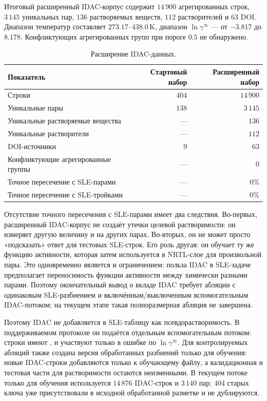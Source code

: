 \documentclass[11pt]{article}
\DeclareRobustCommand{\code}[1]{\texttt{\detokenize{#1}}}
\theoremstyle{definition}
\begin{document}
Итоговый расширенный IDAC-корпус содержит $14\,900$ агрегированных строк, $3\,145$ уникальных пар, $136$ растворяемых веществ, $112$ растворителей и $63$ DOI. Диапазон температур составляет $273.17$--$438.0\,\mathrm K$, диапазон $\ln\gamma^\infty$ --- от $-3.817$ до $8.178$. Конфликтующих агрегированных групп при пороге $0.5$ не обнаружено.

\begin{table}[H]
\centering
\caption{Расширение IDAC-данных.}
\label{tab:idac-corpus}
\begin{tabular}{lrr}
\toprule
Показатель & Стартовый набор & Расширенный набор \\
\midrule
Строки & $404$ & $14\,900$ \\
Уникальные пары & $138$ & $3\,145$ \\
Уникальные растворяемые вещества & --- & $136$ \\
Уникальные растворители & --- & $112$ \\
DOI-источники & $9$ & $63$ \\
Конфликтующие агрегированные группы & --- & $0$ \\
Точное пересечение с SLE-парами & --- & $0\%$ \\
Точное пересечение с SLE-тройками & --- & $0\%$ \\
\bottomrule
\end{tabular}
\end{table}

Отсутствие точного пересечения с SLE-парами имеет два следствия. Во-первых, расширенный IDAC-корпус не создаёт утечки целевой растворимости: он измеряет другую величину и на других парах. Во-вторых, он не может просто «подсказать» ответ для тестовых SLE-строк. Его роль другая: он обучает ту же функцию активности, которая затем используется в NRTL-слое для произвольной пары. Это одновременно является и ограничением: польза IDAC в SLE-задаче предполагает переносимость функции активности между химически разными парами. Поэтому окончательный вывод о вкладе IDAC требует абляции с одинаковым SLE-разбиением и включённым/выключенным вспомогательным IDAC-потоком; на текущем этапе такая полноразмерная абляция не завершена.

Поэтому IDAC не добавляется в SLE-таблицу как псевдорастворимость. В поддерживаемом протоколе он подаётся отдельным вспомогательным потоком: строки имеют \code{has_solubility=false}, \code{has_gamma_inf=true} и участвуют только в ошибке по $\ln\gamma^\infty$. Для контролируемых абляций также создана версия обработанных разбиений только для обучения: новые IDAC-строки добавляются только к обучающему файлу, а валидационная и тестовая части для растворимости остаются неизменными. В текущем потоке только для обучения используется $14\,876$ IDAC-строк и $3\,140$ пар; $404$ старых ключа уже присутствовали в исходной обработанной разметке и не дублируются.
\end{document}
